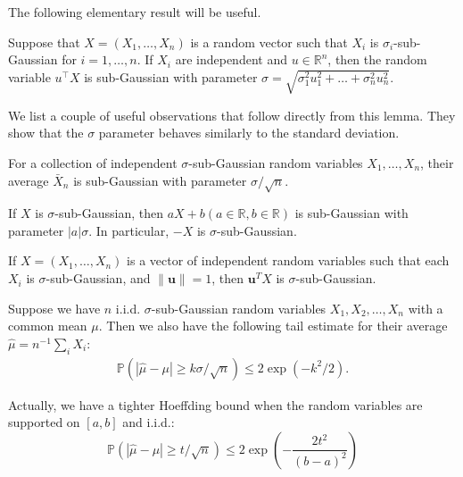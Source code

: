 The following elementary result will be useful.
\begin{lem}
    Suppose that $X=\left(X_1, \ldots, X_n\right)$ is a random vector such that $X_i$ is $\sigma_i$-sub-Gaussian for $i=1, \ldots, n$. If $X_i$ are independent and $u \in \mathbb{R}^n$, then the random variable $u^{\top} X$ is sub-Gaussian with parameter $\sigma=\sqrt{\sigma_1^2 u_1^2+\ldots+\sigma_n^2 u_n^2}$.
\end{lem}

We list a couple of useful observations that follow directly from this lemma. They show that the $\sigma$ parameter behaves similarly to the standard deviation.

\begin{cor}
    For a collection of independent $\sigma$-sub-Gaussian random variables $X_1, \ldots, X_n$, their average $\bar{X}_n$ is sub-Gaussian with parameter $\sigma / \sqrt{n}$.
\end{cor}

\begin{cor}
    If $X$ is $\sigma$-sub-Gaussian, then $a X+b(a \in \mathbb{R}, b \in \mathbb{R})$ is sub-Gaussian with parameter $|a| \sigma$. In particular, $-X$ is $\sigma$-sub-Gaussian.
\end{cor}

\begin{cor}
    If $X=\left(X_1, \ldots, X_n\right)$ is a vector of independent random variables such that each $X_i$ is $\sigma$-sub-Gaussian, and $\|\boldsymbol{u}\|=1$, then $\boldsymbol{u}^T X$ is $\sigma$-sub-Gaussian.
\end{cor}



\begin{cor}
    Suppose we have $n$ i.i.d. $\sigma$-sub-Gaussian random variables $X_1, X_2, \ldots, X_n$ with a common mean $\mu$. Then we also have the following tail estimate for their average $\widehat{\mu}= n^{-1} \sum_i X_i$:
    \begin{align*}
\mathbb{P}(|\widehat{\mu}-\mu| \geq k \sigma / \sqrt{n}) \leq 2 \exp \left(-k^2 / 2\right).
\end{align*}
\end{cor} 

\begin{remark}
    Actually, we have a tighter Hoeffding bound when the random variables are supported on $[a,b]$ and i.i.d.:
    \[
    \mathbb{P}\left(\left|\hat{\mu}-\mu\right| \geq t/\sqrt{n}\right) \leq 2 \exp \left(-\frac{2 t^2}{(b-a)^2}\right)
    \]
\end{remark}

